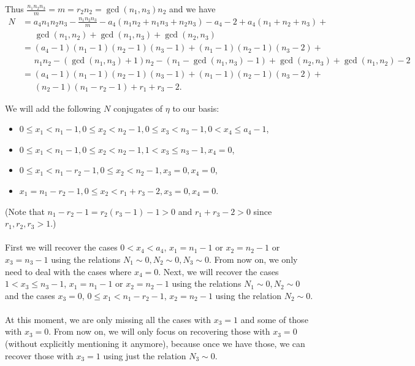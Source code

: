 \documentclass[12pt,a4paper]{article}
\theoremstyle{definition}
\begin{document}
Thus $\frac{n_1n_2n_3}{m}=m=r_2n_2=\gcd(n_1,n_3)n_2$ and we have
\begin{align*}
N&=a_4n_1n_2n_3-\frac{n_1n_2n_3}{m}-a_4(n_1n_2+n_1n_3+n_2n_3)-a_4-2+a_4(n_1+n_2+n_3)+\\
&\phantom{am}\gcd(n_1,n_2)+\gcd(n_1,n_3)+\gcd(n_2,n_3)\\
&=(a_4-1)(n_1-1)(n_2-1)(n_3-1)+(n_1-1)(n_2-1)(n_3-2)+\\
&\phantom{am}n_1n_2-(\gcd(n_1,n_3)+1)n_2-(n_1-\gcd(n_1,n_3)-1)+\gcd(n_2,n_3)+\gcd(n_1,n_2)-2\\
&=(a_4-1)(n_1-1)(n_2-1)(n_3-1)+(n_1-1)(n_2-1)(n_3-2)+\\
&\phantom{am}(n_2-1)(n_1-r_2-1)+r_1+r_3-2.
\end{align*}

We will add the following $N$ conjugates of $\eta$ to our basis:
\begin{itemize}
\item $0\leq x_1<n_1-1, 0\leq x_2<n_2-1, 0\leq x_3<n_3-1, 0<x_4\leq a_4-1$,
\item $0\leq x_1<n_1-1, 0\leq x_2<n_2-1, 1< x_3 \leq n_3-1, x_4=0$,
\item $0\leq x_1< n_1-r_2-1, 0\leq x_2<n_2-1, x_3=0, x_4=0$,
\item           $x_1=n_1-r_2-1, 0\leq x_2<r_1+r_3-2, x_3=0, x_4=0$.
\end{itemize}
(Note that $n_1-r_2-1=r_2(r_3-1)-1> 0$ and $r_1+r_3-2>0$ since $r_1,r_2,r_3>1$.)
\paragraph*{}
First we will recover the cases $0<x_4<a_4$, $x_1=n_1-1$ or $x_2=n_2-1$ or $x_3=n_3-1$ using the relations $N_1\sim 0, N_2\sim 0, N_3\sim 0$. From now on, we only need to deal with the cases where $x_4=0$. Next, we will recover the cases $1< x_3 \leq n_3-1$, $x_1=n_1-1$ or $x_2=n_2-1$ using the relations $N_1\sim 0, N_2\sim 0$ and the cases $x_3=0$, $0\leq x_1< n_1-r_2-1$, $x_2=n_2-1$ using the relation $N_2\sim 0$.
\paragraph*{}
At this moment, we are only missing all the cases with $x_3=1$ and some of those with $x_3=0$. From now on, we will only focus on recovering those with $x_3=0$ (without explicitly mentioning it anymore), because once we have those, we can recover those with $x_3=1$ using just the relation $N_3\sim 0$.
\end{document}
